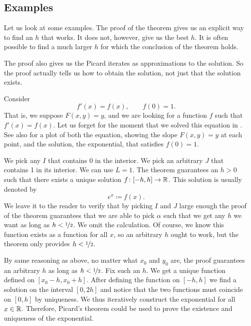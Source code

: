 \subsection{Examples}

Let us look at some examples.  The proof of the theorem 
gives us an explicit way to find an $h$ that works.  It does not, however, give
us the best $h$.  It is often possible to find a much larger $h$ for
which the conclusion of the theorem holds.

The proof also gives us the Picard iterates as approximations to the
solution.  So the proof actually tells us how to obtain
the solution, not just that the solution exists.

\begin{example} \label{example:picardexponential}
Consider
\begin{equation*}
f'(x) = f(x), \qquad f(0) = 1 .
\end{equation*}
That is, we suppose $F(x,y) = y$, and we are looking for a function 
$f$ such that $f'(x) = f(x)$.
Let us forget for the moment that we solved this equation in 
.  See also  for a plot of
both the equation, showing
the slope $F(x,y)=y$ at each point, and the solution,
the exponential, that satisfies $f(0)=1$.

We pick any $I$ that contains 0
in the interior.
We pick an arbitrary $J$ that contains 1 in its interior.  We can
use $L = 1$.
The theorem guarantees an $h > 0$ such that
there exists a unique solution $f \colon [-h,h] \to {\mathbb{R}}$.  This solution
is usually denoted by
\begin{equation*}
e^x \coloneqq f(x) .
\end{equation*}
We leave it to the reader to verify that by picking $I$ and $J$
large enough the proof of the theorem guarantees that
we are able to pick $\alpha$ such that we get any
$h$ we want as long as $h < \nicefrac{1}{2}$.  We omit the calculation.
Of course, we know %
this function exists
as a function for all $x$, so an arbitrary $h$ ought to work, but the
theorem only provides $h < \nicefrac{1}{2}$.

By same reasoning as above,
no matter what $x_0$ and $y_0$ are,
the proof guarantees an arbitrary $h$ as long as $h < \nicefrac{1}{2}$.
Fix such an $h$.
We get a unique function defined on $[x_0-h,x_0+h]$.  After defining the
function on $[-h,h]$ we find a solution on the interval $[0,2h]$
and notice that the two functions must coincide on $[0,h]$ by uniqueness.
We thus iteratively construct the exponential for all $x \in {\mathbb{R}}$.
Therefore, Picard's theorem could be used to prove the existence and uniqueness
of the exponential.


\end{example}
